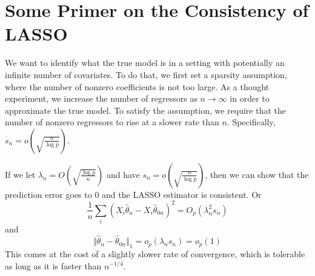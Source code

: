 \section{Some Primer on the Consistency of LASSO}
We want to identify what the true model is in a setting with potentially an infinite number of covariates. To do that, we first set a sparsity assumption, where the number of nonzero coefficients is not too large. As a thought experiment, we increase the number of regressors as $n\to\infty$ in order to approximate the true model. To satisfy the assumption, we require that the number of nonzero regressors to rise at a slower rate than $n$. Specifically, $s_n = o\left(\sqrt{\frac{n}{\log p}}\right)$. \par
If we let $\lambda_n = O\left(\sqrt{\frac{\log p}{n}}\right)$ and have $s_n=o\left(\sqrt{\frac{n}{\log p}}\right)$, then we can show that the prediction error goes to 0 and the LASSO estimator is consistent. Or
\[
\frac{1}{n}\sum_i(X_i\hat{\theta}_n-X_i\hat{\theta}_{0n})^2=O_p(\lambda_n^2s_n)
\]
and 
\[
\Vert \hat{\theta}_n-\hat{\theta}_{0n}\Vert_1 = o_p(\lambda_n s_n) = o_p(1)
\]
This comes at the cost of a slightly slower rate of convergence, which is tolerable as long as it is faster than $n^{-1/4}$.


